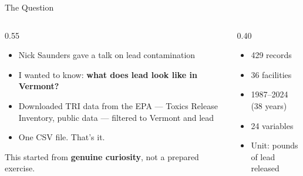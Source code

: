 \documentclass[aspectratio=169, 10pt]{beamer}
\begin{document}
\begin{frame}{The Question}
\begin{columns}[T]
\begin{column}{0.55\textwidth}
\vskip6pt
\begin{itemize}\setlength{\itemsep}{6pt}
  \item Nick Saunders gave a talk on lead contamination
  \item I wanted to know: \textbf{what does lead look like in Vermont?}
  \item Downloaded TRI data from the EPA --- Toxics Release Inventory, public data --- filtered to Vermont and lead
  \item One CSV file. That's it.
\end{itemize}
\vskip8pt
\begin{tcolorbox}[quotebox]
\small This started from \textbf{genuine curiosity}, not a prepared exercise.
\end{tcolorbox}
\end{column}
\begin{column}{0.40\textwidth}
\begin{tcolorbox}[keybox, title={\faDatabase\quad The Data}]
\small
\begin{itemize}\setlength{\itemsep}{2pt}
  \item 429 records
  \item 36 facilities
  \item 1987--2024 (38 years)
  \item 24 variables
  \item Unit: pounds of lead released
\end{itemize}
\end{tcolorbox}
\end{column}
\end{columns}
\end{frame}
\end{document}

